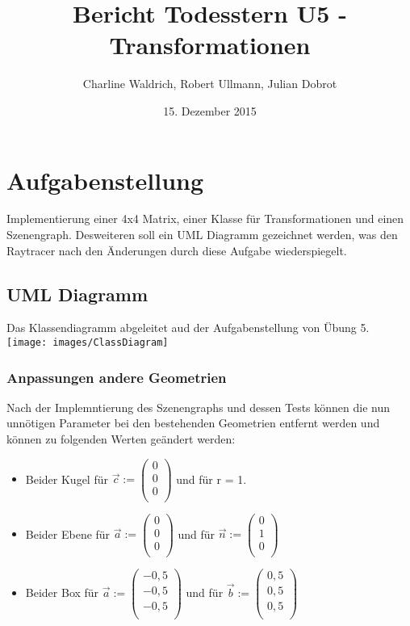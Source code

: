 \documentclass[14pt]{extarticle}
\title{Bericht Todesstern U5 - Transformationen}
\author{Charline Waldrich, Robert Ullmann, Julian Dobrot}
\date{15. Dezember 2015}
\begin{document}
\maketitle
\pagebreak
\tableofcontents

\section{Aufgabenstellung}
Implementierung einer 4x4 Matrix, einer Klasse für Transformationen und einen Szenengraph. Desweiteren soll ein UML Diagramm gezeichnet werden, was den Raytracer nach den Änderungen durch diese Aufgabe wiederspiegelt.
\subsection{UML Diagramm}
Das Klassendiagramm abgeleitet aud der Aufgabenstellung von Übung 5.\\
\texttt{[image: images/ClassDiagram]}\\

\subsubsection{Anpassungen andere Geometrien}
Nach der Implemntierung des Szenengraphs und dessen Tests können die nun unnötigen Parameter bei den bestehenden Geometrien entfernt werden und können zu folgenden Werten geändert werden:

\begin{itemize} 
\item Beider Kugel für $\vec{c} :=\begin{pmatrix} 0 \\ 0\\ 0 \\\end{pmatrix} $  und für r = 1.
\item Beider Ebene für $\vec{a} :=\begin{pmatrix} 0 \\ 0\\ 0 \\\end{pmatrix} $ und für 
$\vec{n} :=\begin{pmatrix} 0 \\ 1\\ 0 \\\end{pmatrix} $
\item Beider Box für $\vec{a} :=\begin{pmatrix} -0,5\\ -0,5\\ -0,5 \\\end{pmatrix} $ und für
$\vec{b} :=\begin{pmatrix} 0,5 \\ 0,5\\ 0,5 \\\end{pmatrix} $
\end{itemize}
\end{document}
